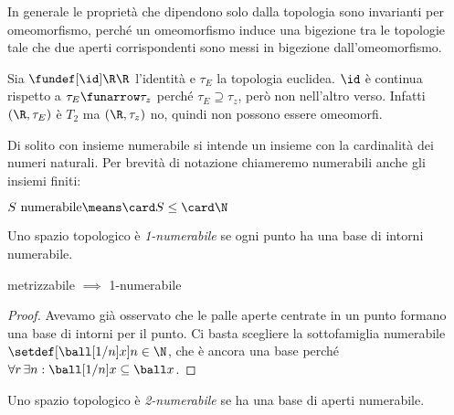 \begin{oss}
	In generale le proprietà che dipendono solo dalla topologia sono invarianti per omeomorfismo, perché un omeomorfismo induce una bigezione tra le topologie tale che due aperti corrispondenti sono messi in bigezione dall'omeomorfismo.
\end{oss}

\begin{es}
	Sia $\fundef[\id]\R\R$ l'identità e $\tau_E$ la topologia euclidea.
	$\id$ è continua rispetto a $\tau_E\funarrow\tau_z$ perché $\tau_E\supseteq\tau_z$,
	però non nell'altro verso.
	Infatti $(\R,\tau_E)$ è $T_2$ ma $(\R,\tau_z)$ no,
	quindi non possono essere omeomorfi.
\end{es}


Di solito con insieme numerabile si intende un insieme con la cardinalità dei numeri naturali. Per brevità di notazione chiameremo numerabili anche gli insiemi finiti:

\begin{defn}[Numerabilità]
	$S\text{ numerabile}\means\card S\leq\card\N$
\end{defn}

\begin{defn}[1-numerabilità]
	Uno spazio topologico è \emph{1-numerabile} se ogni punto ha una base di intorni numerabile.
\end{defn}

\begin{prop}
	metrizzabile $\implies$ 1-numerabile
\end{prop}

\begin{proof}
	Avevamo già osservato che le palle aperte centrate in un punto formano una base di intorni per il punto.
	Ci basta scegliere la sottofamiglia numerabile $\setdef[{\ball[1/n]x}]{n\in\N}$,
	che è ancora una base perché $\forall r\,\exists n:\ball[1/n]x\subseteq\ball x$.
\end{proof}

\begin{defn}[2-numerabilità]
	Uno spazio topologico è \emph{2-numerabile} se ha una base di aperti numerabile.
\end{defn}
